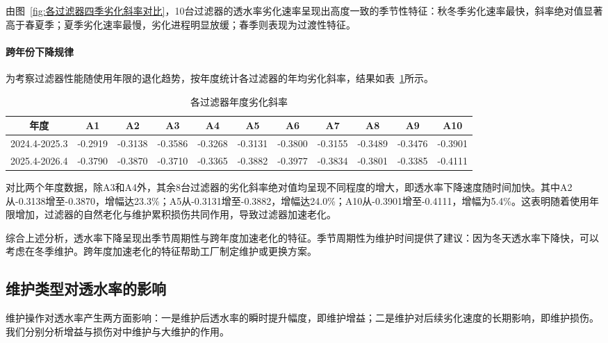 \documentclass[withoutpreface,bwprint]{cumcmthesis}
\begin{document}
由图~\ref{fig:各过滤器四季劣化斜率对比}，10台过滤器的透水率劣化速率呈现出高度一致的季节性特征：秋冬季劣化速率最快，斜率绝对值显著高于春夏季；夏季劣化速率最慢，劣化进程明显放缓；春季则表现为过渡性特征。

\paragraph{跨年份下降规律}

为考察过滤器性能随使用年限的退化趋势，按年度统计各过滤器的年均劣化斜率，结果如表~\ref{tab:跨年份}所示。

\begin{table}[H]
	\centering
	\setlength{\tabcolsep}{4pt}
	\renewcommand{\arraystretch}{1.2}
	\caption{各过滤器年度劣化斜率}
	\label{tab:跨年份}
	\begin{tabular}{ccccccccccc}
		\toprule
		\textbf{年度} & \textbf{A1} & \textbf{A2} & \textbf{A3} & \textbf{A4} & \textbf{A5} & \textbf{A6} & \textbf{A7} & \textbf{A8} & \textbf{A9} & \textbf{A10} \\
		\midrule
		\rowcolor{LightBlue}
		2024.4-2025.3 & -0.2919 & -0.3138 & -0.3586 & -0.3268 & -0.3131 & -0.3800 & -0.3155 & -0.3489 & -0.3476 & -0.3901 \\
		2025.4-2026.4 & -0.3790 & -0.3870 & -0.3710 & -0.3365 & -0.3882 & -0.3977 & -0.3834 & -0.3801 & -0.3385 & -0.4111 \\
		\bottomrule
	\end{tabular}
\end{table}

对比两个年度数据，除A3和A4外，其余8台过滤器的劣化斜率绝对值均呈现不同程度的增大，即透水率下降速度随时间加快。其中A2从-0.3138增至-0.3870，增幅达23.3\%；A5从-0.3131增至-0.3882，增幅达24.0\%；A10从-0.3901增至-0.4111，增幅为5.4\%。这表明随着使用年限增加，过滤器的自然老化与维护累积损伤共同作用，导致过滤器加速老化。

综合上述分析，透水率下降呈现出季节周期性与跨年度加速老化的特征。季节周期性为维护时间提供了建议：因为冬天透水率下降快，可以考虑在冬季维护。跨年度加速老化的特征帮助工厂制定维护或更换方案。



\subsection{维护类型对透水率的影响}

维护操作对透水率产生两方面影响：一是维护后透水率的瞬时提升幅度，即维护增益；二是维护对后续劣化速度的长期影响，即维护损伤。我们分别分析增益与损伤对中维护与大维护的作用。
\end{document}
